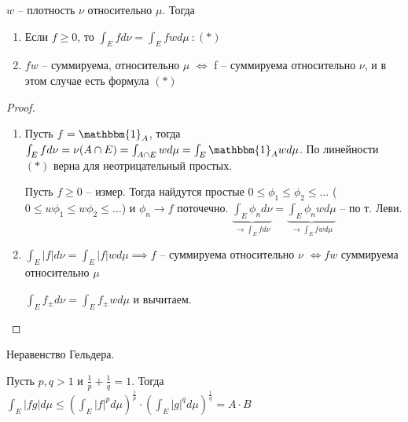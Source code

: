 \begin{theorem}
    $w$ --  плотность $\nu$ относительно $\mu$. Тогда 

    \begin{enumerate}
        \item Если $f \geq 0$, то $\int_E f d \nu = \int_E f w d \mu \ : (*)$
        \item $fw$ -- суммируема, относительно $\mu$ $\Leftrightarrow$ f -- суммируема относительно $\nu$, и в этом случае есть формула $(*)$
    \end{enumerate}
\end{theorem}
\begin{proof}
    \begin{enumerate}
        \item {
            Пусть $f = \mathbbm{1}_A$, тогда $\int_E f d \nu = \nu (A \cap E) = \int_{A \cap E} w d \mu = \int_E \mathbbm{1}_A w d \mu$. По линейности $(*)$ верна для неотрицательный простых.

            Пусть $f \geq 0$ -- измер. Тогда найдутся простые $0 \leq \phi_1 \leq \phi_2 \leq \dots$ ($0 \leq w \phi_1 \leq w \phi_2 \leq \dots$) и $\phi_n \rightarrow f$ поточечно. $\underbrace{\int_E \phi_n d \nu}_{\rightarrow \int_E f d \nu} = \underbrace{\int_E \phi_n w d \mu}_{\rightarrow \int_E f w d \mu}$ -- по т. Леви.
        }
        \item {
            $\int_E |f| d \nu = \int_E |f| w d \mu \implies f$ -- суммируема относительно $\nu$ $\Leftrightarrow f w$ суммируема относительно $\mu$

            $\int_E f_{\pm} d \nu = \int_E f_{\pm} w d \mu$ и вычитаем.
        }
    \end{enumerate}
\end{proof}
\begin{properties}
    Неравенство Гельдера.

    Пусть $p, q > 1$ и $\frac{1}{p} + \frac{1}{q} = 1$. Тогда $\int_E |fg|d \mu \leq \left(\int_E |f|^p d \mu\right)^{\frac{1}{p}} \cdot \left(\int_E |g|^q d \mu\right)^{\frac{1}{q}} = A \cdot B$
\end{properties}
